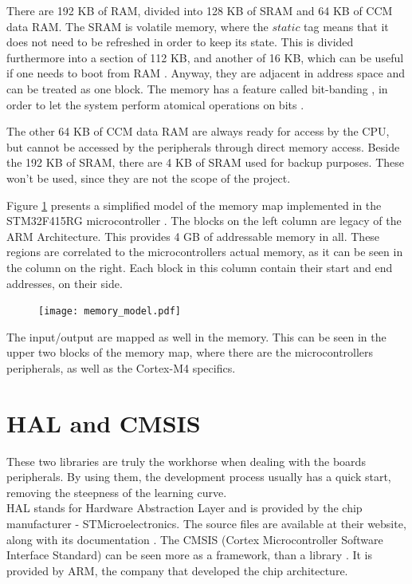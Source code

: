There are 192 KB of RAM, divided into 128 KB of SRAM and 64 KB of 
CCM data RAM.
The SRAM is volatile memory, where the $static$ tag means 
that it does not need to be refreshed in order to
keep its state. This is divided furthermore into a section of 112 KB, and 
another of 16 KB, which can be useful if one needs to boot from RAM
\cite{run_from_ram}. Anyway, they are adjacent in address space and can be
treated as one block.
The memory has a feature called bit-banding , in order to let the system
perform atomical operations on bits \cite{bit_banding}.

The other 64 KB of CCM data RAM are always ready for access by the CPU,
but cannot be accessed by the peripherals through direct memory access.
Beside the 192 KB of SRAM, there are 4 KB of SRAM used for backup purposes.
These won't be used, since they are not the scope of the project.

Figure \ref{fig:memory_model} presents a simplified model of the 
memory map implemented in the STM32F415RG microcontroller
\cite{stm32_datasheet_74}. The blocks
on the left column are legacy of the ARM Architecture. This provides 
4 GB of addressable memory in all.
These regions are correlated to the microcontroller\textquotesingle s
actual memory, as it can be seen in the column on the right. Each block
in this column contain their start and end addresses, on their side.

\begin{figure}[H]
\centering
\texttt{[image: memory\_model.pdf]}
\label{fig:memory_model}
\end{figure}


The input/output are mapped as well in the memory. This can be seen in
the upper two blocks of the memory map, where there are the 
microcontroller\textquotesingle s peripherals, as well as the Cortex-M4
specifics.

\section{HAL and CMSIS}
These two libraries are truly the workhorse when dealing with the 
board\textquotesingle s peripherals. By using them, the development
process usually has a quick start, removing the steepness of the 
learning curve.	\\
HAL stands for Hardware Abstraction Layer and is provided by the chip manufacturer - STMicroelectronics. The source files are available at
their website, along with its documentation \cite{HAL_library}.
The CMSIS (Cortex Microcontroller Software Interface Standard)
can be seen more as a framework, than a library
 \cite{CMSIS_core_library}. It is provided
by ARM, the company that developed the chip architecture.

